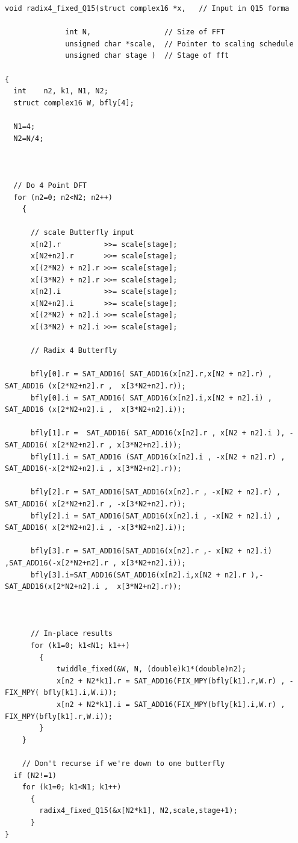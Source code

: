 \documentclass{article}
\begin{document}
\begin{lstlisting}
void radix4_fixed_Q15(struct complex16 *x,   // Input in Q15 forma

		      int N,                 // Size of FFT
		      unsigned char *scale,  // Pointer to scaling schedule
		      unsigned char stage )  // Stage of fft
                                             
{ 
  int    n2, k1, N1, N2;
  struct complex16 W, bfly[4];

  N1=4;
  N2=N/4;
    


  // Do 4 Point DFT  
  for (n2=0; n2<N2; n2++)
    {

      // scale Butterfly input
      x[n2].r          >>= scale[stage];
      x[N2+n2].r       >>= scale[stage];
      x[(2*N2) + n2].r >>= scale[stage];
      x[(3*N2) + n2].r >>= scale[stage];
      x[n2].i          >>= scale[stage];
      x[N2+n2].i       >>= scale[stage];
      x[(2*N2) + n2].i >>= scale[stage];
      x[(3*N2) + n2].i >>= scale[stage];
      
      // Radix 4 Butterfly

      bfly[0].r = SAT_ADD16( SAT_ADD16(x[n2].r,x[N2 + n2].r) , SAT_ADD16 (x[2*N2+n2].r ,  x[3*N2+n2].r));
      bfly[0].i = SAT_ADD16( SAT_ADD16(x[n2].i,x[N2 + n2].i) , SAT_ADD16 (x[2*N2+n2].i ,  x[3*N2+n2].i));

      bfly[1].r =  SAT_ADD16( SAT_ADD16(x[n2].r , x[N2 + n2].i ), - SAT_ADD16( x[2*N2+n2].r , x[3*N2+n2].i));
      bfly[1].i = SAT_ADD16 (SAT_ADD16(x[n2].i , -x[N2 + n2].r) , SAT_ADD16(-x[2*N2+n2].i , x[3*N2+n2].r));

      bfly[2].r = SAT_ADD16(SAT_ADD16(x[n2].r , -x[N2 + n2].r) , SAT_ADD16( x[2*N2+n2].r , -x[3*N2+n2].r));
      bfly[2].i = SAT_ADD16(SAT_ADD16(x[n2].i , -x[N2 + n2].i) , SAT_ADD16( x[2*N2+n2].i , -x[3*N2+n2].i));

      bfly[3].r = SAT_ADD16(SAT_ADD16(x[n2].r ,- x[N2 + n2].i) ,SAT_ADD16(-x[2*N2+n2].r , x[3*N2+n2].i));
	  bfly[3].i=SAT_ADD16(SAT_ADD16(x[n2].i,x[N2 + n2].r ),-SAT_ADD16(x[2*N2+n2].i ,  x[3*N2+n2].r));
 


      // In-place results
      for (k1=0; k1<N1; k1++)
		{
	  		twiddle_fixed(&W, N, (double)k1*(double)n2);
		    x[n2 + N2*k1].r = SAT_ADD16(FIX_MPY(bfly[k1].r,W.r) , -FIX_MPY( bfly[k1].i,W.i));
            x[n2 + N2*k1].i = SAT_ADD16(FIX_MPY(bfly[k1].i,W.r) , FIX_MPY(bfly[k1].r,W.i));
		}
    }
    
    // Don't recurse if we're down to one butterfly 
  if (N2!=1)
    for (k1=0; k1<N1; k1++)
      {
		radix4_fixed_Q15(&x[N2*k1], N2,scale,stage+1);
      }
}



\end{lstlisting}
\end{document}
